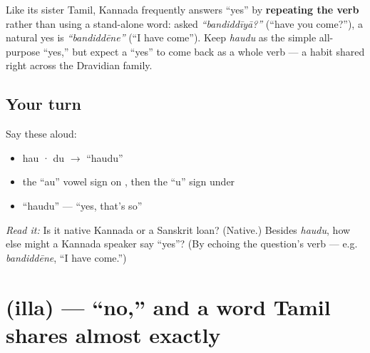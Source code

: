 \begin{grammarlens}[title={Grammar Lens: Dravidian often answers by echoing the verb}]
Like its sister Tamil, Kannada frequently answers \textquotedblleft{}yes\textquotedblright{} by \textbf{repeating the verb} rather than using a stand-alone word: asked \emph{\textquotedblleft{}bandiddīyā?\textquotedblright{}} (\textquotedblleft{}have you come?\textquotedblright{}), a natural yes is \emph{\textquotedblleft{}bandiddēne\textquotedblright{}} (\textquotedblleft{}I have come\textquotedblright{}). Keep \emph{haudu} as the simple all-purpose \textquotedblleft{}yes,\textquotedblright{} but expect a \textquotedblleft{}yes\textquotedblright{} to come back as a whole verb — a habit shared right across the Dravidian family.
\end{grammarlens}

\subsection*{Your turn}
Say these aloud:

\begin{itemize}
\raggedright
  \item hau · du $\to$ \textquotedblleft{}haudu\textquotedblright{}
  \item the \textquotedblleft{}au\textquotedblright{} vowel sign on , then the \textquotedblleft{}u\textquotedblright{} sign under 
  \item \textquotedblleft{}haudu\textquotedblright{} — \textquotedblleft{}yes, that's so\textquotedblright{}
\end{itemize}

\begin{tcolorbox}[breakable,colback=teal!4,colframe=teal!35!black,title={Before you move on}]
\emph{Read it:} \textbf{} Is it native Kannada or a Sanskrit loan? (Native.) Besides \emph{haudu}, how else might a Kannada speaker say \textquotedblleft{}yes\textquotedblright{}? (By echoing the question's verb — e.g. \emph{bandiddēne}, \textquotedblleft{}I have come.\textquotedblright{})
\end{tcolorbox}
\section[\texorpdfstring{\kn{ಇಲ್ಲ} (illa)}{ಇಲ್ಲ (illa)}]{ (illa) — \textquotedblleft{}no,\textquotedblright{} and a word Tamil shares almost exactly}

\label{lesson:KA-C01-illa}



